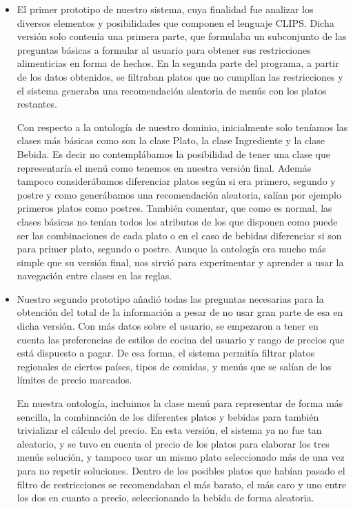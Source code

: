 \documentclass{article}
\begin{document}
\begin{itemize}
    \item El primer prototipo de nuestro sistema, cuya finalidad fue analizar los diversos elementos y posibilidades que componen el lenguaje CLIPS. Dicha versión solo contenía una primera parte, que formulaba un subconjunto de las preguntas básicas a formular al usuario para obtener sus restricciones alimenticias en forma de hechos. En la segunda parte del programa, a partir de los datos obtenidos, se filtraban platos que no cumplían las restricciones y el sistema generaba una recomendación aleatoria de menús con los platos restantes.
    \par
    Con respecto a la ontología de nuestro dominio, inicialmente solo teníamos las clases más básicas como son la clase Plato, la clase Ingrediente y la clase Bebida. Es decir no contemplábamos la posibilidad de tener una clase que representaría el menú como tenemos en nuestra versión final. Además tampoco considerábamos diferenciar platos según si era primero, segundo y postre y como generábamos una recomendación aleatoria, salían por ejemplo primeros platos como postres. También comentar, que como es normal, las clases básicas no tenían todos los atributos de los que disponen como puede ser las combinaciones de cada plato o en el caso de bebidas diferenciar si son para primer plato, segundo o postre. Aunque la ontología era mucho más simple que su versión final, nos sirvió para experimentar y aprender a usar la navegación entre clases en las reglas.

    \item Nuestro segundo prototipo añadió todas las preguntas necesarias para la obtención del total de la información a pesar de no usar gran parte de esa en dicha versión. Con más datos sobre el usuario, se empezaron a tener en cuenta las preferencias de estilos de cocina del usuario y rango de precios que está dispuesto a pagar. De esa forma, el sistema permitía filtrar platos regionales de ciertos países, tipos de comidas, y menús que se salían de los límites de precio marcados.
    \par
    En nuestra ontología, incluimos la clase menú para representar de forma más sencilla, la combinación de los diferentes platos y bebidas para también trivializar el cálculo del precio. En esta versión, el sistema ya no fue tan aleatorio, y se tuvo en cuenta el precio de los platos para elaborar los tres menús solución, y tampoco usar un mismo plato seleccionado más de una vez para no repetir soluciones. Dentro de los posibles platos que habían pasado el filtro de restricciones se recomendaban el más barato, el más caro y uno entre los dos en cuanto a precio, seleccionando la bebida de forma aleatoria.


\end{itemize}
\end{document}
